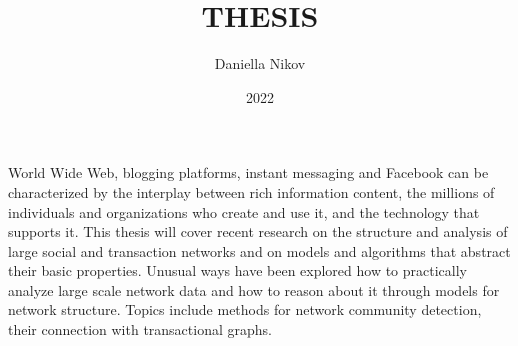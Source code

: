 \documentclass{article}
\title{THESIS}
\author{Daniella Nikov}
\date{2022}
\begin{document}
\maketitle

World Wide Web, blogging platforms, instant messaging and Facebook can be characterized by the interplay between rich information content, the millions of individuals and organizations who create and use it, and the technology that supports it. This thesis will cover recent research on the structure and analysis of large social and transaction networks and on models and algorithms that abstract their basic properties. Unusual ways have been explored how to practically analyze large scale network data and how to reason about it through models for network structure. Topics include methods for network community detection, their connection with transactional graphs.
\end{document}
